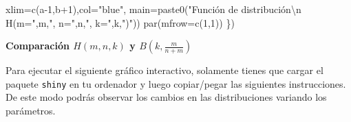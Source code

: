 \documentclass[
  letterpaper,
  DIV=11,
  numbers=noendperiod]{scrreprt}
\newenvironment{Shaded}{\begin{snugshade}}{\end{snugshade}}
\newcommand{\AttributeTok}[1]{\textcolor[rgb]{0.40,0.45,0.13}{#1}}
\newcommand{\DecValTok}[1]{\textcolor[rgb]{0.68,0.00,0.00}{#1}}
\newcommand{\FunctionTok}[1]{\textcolor[rgb]{0.28,0.35,0.67}{#1}}
\newcommand{\NormalTok}[1]{\textcolor[rgb]{0.00,0.23,0.31}{#1}}
\newcommand{\SpecialCharTok}[1]{\textcolor[rgb]{0.37,0.37,0.37}{#1}}
\newcommand{\StringTok}[1]{\textcolor[rgb]{0.13,0.47,0.30}{#1}}
\begin{document}
\begin{Shaded}
\begin{Highlighting}[]
        \AttributeTok{xlim=}\FunctionTok{c}\NormalTok{(a}\DecValTok{{-}1}\NormalTok{,b}\SpecialCharTok{+}\DecValTok{1}\NormalTok{),}\AttributeTok{col=}\StringTok{"blue"}\NormalTok{,}
        \AttributeTok{main=}\FunctionTok{paste0}\NormalTok{(}\StringTok{"Función de distribución}\SpecialCharTok{\textbackslash{}n}\StringTok{ H(m="}\NormalTok{,m,}\StringTok{", n="}\NormalTok{,n,}\StringTok{", k="}\NormalTok{,k,}\StringTok{")"}\NormalTok{))}
  \FunctionTok{par}\NormalTok{(}\AttributeTok{mfrow=}\FunctionTok{c}\NormalTok{(}\DecValTok{1}\NormalTok{,}\DecValTok{1}\NormalTok{))}
\NormalTok{\})}
\end{Highlighting}
\end{Shaded}

\textbf{Comparación \(H(m,n,k)\) y \(B\left(k,\frac{m}{n+m}\right)\)}

Para ejecutar el siguiente gráfico interactivo, solamente tienes que
cargar el paquete \texttt{shiny} en tu ordenador y luego copiar/pegar
las siguientes instrucciones. De este modo podrás observar los cambios
en las distribuciones variando los parámetros.
\end{document}
